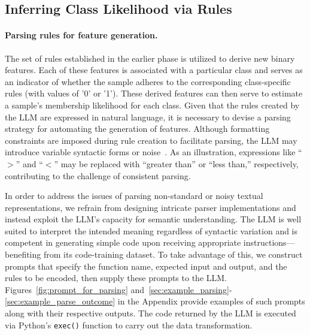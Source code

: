 \subsection{Inferring Class Likelihood via Rules}
\label{Sec:training}

\paragraph{Parsing rules for feature generation.} The set of rules established in the earlier phase is utilized to derive new binary features. Each of these features is associated with a particular class and serves as an indicator of whether the sample adheres to the corresponding class-specific rules (with values of '0' or '1'). These derived features can then serve to estimate a sample’s membership likelihood for each class. Given that the rules created by the LLM are expressed in natural language, it is necessary to devise a parsing strategy for automating the generation of features. Although formatting constraints are imposed during rule creation to facilitate parsing, the LLM may introduce variable syntactic forms or noise~\cite{kovavc2023large}. As an illustration, expressions like ``$>$” and ``$<$” may be replaced with ``greater than” or ``less than,” respectively, contributing to the challenge of consistent parsing.

In order to address the issues of parsing non-standard or noisy textual representations, we refrain from designing intricate parser implementations and instead exploit the LLM’s capacity for semantic understanding. The LLM is well suited to interpret the intended meaning regardless of syntactic variation and is competent in generating simple code upon receiving appropriate instructions—benefiting from its code-training dataset. To take advantage of this, we construct prompts that specify the function name, expected input and output, and the rules to be encoded, then supply these prompts to the LLM. Figures~\ref{fig:prompt_for_parsing} and~\ref{sec:example_parsing}-\ref{sec:example_parse_outcome} in the Appendix provide examples of such prompts along with their respective outputs. The code returned by the LLM is executed via Python’s \texttt{exec()} function to carry out the data transformation.

\vspace*{-0.12in}
